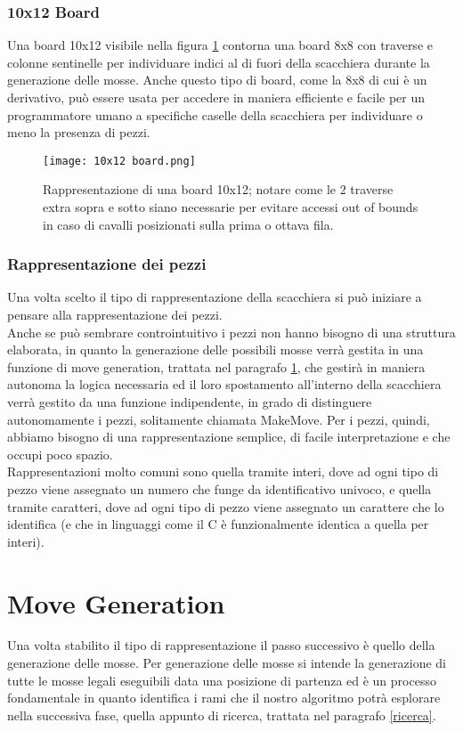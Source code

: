 \subsubsection{10x12 Board}
Una board 10x12 visibile nella figura \ref{10x12} contorna una board 8x8 con traverse e colonne sentinelle per individuare indici al di fuori della scacchiera durante la generazione delle mosse. Anche questo tipo di board, 
come la 8x8 di cui è un derivativo, può essere usata per accedere in maniera efficiente e facile per un programmatore umano a specifiche caselle della scacchiera per individuare o meno la presenza di pezzi.
\vfill
\begin{figure}[!ht]
    \centering
    \texttt{[image: 10x12 board.png]}
    \caption{Rappresentazione di una board 10x12; notare come le 2 traverse extra sopra e sotto siano necessarie per evitare accessi out of bounds in caso di cavalli posizionati sulla prima o ottava fila. }
    \label{10x12}
\end{figure}



\subsubsection{Rappresentazione dei pezzi}
Una volta scelto il tipo di rappresentazione della scacchiera si può iniziare a pensare alla rappresentazione dei pezzi.
\\Anche se può sembrare controintuitivo i pezzi non hanno bisogno di una struttura elaborata, in quanto la generazione delle possibili
mosse verrà gestita in una funzione di move generation, trattata nel paragrafo \ref{move generation}, che gestirà in maniera autonoma la logica necessaria ed il loro spostamento all'interno della scacchiera verrà gestito da una funzione indipendente, in grado di distinguere autonomamente i pezzi, solitamente chiamata
MakeMove. Per i pezzi, quindi, abbiamo bisogno di una
rappresentazione semplice, di facile interpretazione e che occupi poco spazio.\\Rappresentazioni molto comuni sono quella
tramite interi, dove ad ogni tipo di pezzo viene assegnato un numero che funge da identificativo univoco, e quella tramite
caratteri, dove ad ogni tipo di pezzo viene assegnato un carattere che lo identifica (e che in linguaggi come il C è funzionalmente identica a quella per interi).


\section{Move Generation}
\label{move generation} %
%
Una volta stabilito il tipo di rappresentazione il passo successivo è quello della generazione delle mosse. Per generazione delle mosse si intende la generazione
di tutte le mosse legali eseguibili data una posizione di partenza ed è un processo fondamentale in quanto identifica i rami che
il nostro algoritmo potrà esplorare nella successiva fase, quella appunto di ricerca, trattata nel paragrafo \ref{ricerca}.



